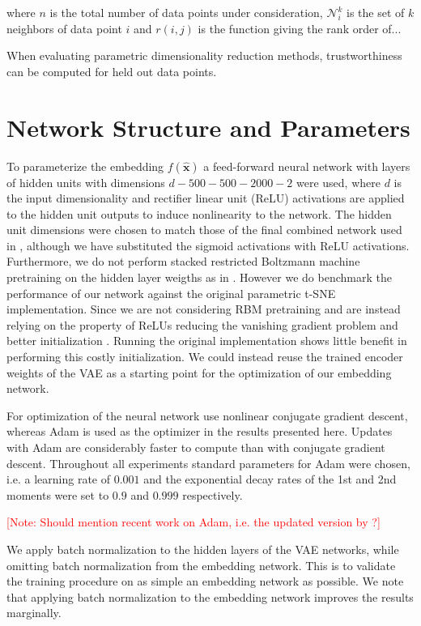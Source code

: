 where $n$ is the total number of data points under consideration, $\mathcal{N}_{i}^{k}$ is the set of $k$ neighbors of data point $i$ and $r(i, j)$ is the function giving the rank order of...

When evaluating parametric dimensionality reduction methods, trustworthiness can be computed for held out data points.

\section{Network Structure and Parameters}

To parameterize the embedding $f(\mathbf{\hat{x}})$ a feed-forward neural network with layers of hidden units with dimensions $d - 500 - 500 - 2000 - 2$ were used, where $d$ is the input dimensionality and rectifier linear unit (ReLU) activations are applied to the hidden unit outputs to induce nonlinearity to the network. The hidden unit dimensions were chosen to match those of the final combined network used in \citep{parametric_tsne}, although we have substituted the sigmoid activations with ReLU activations. Furthermore, we do not perform stacked restricted Boltzmann machine pretraining on the hidden layer weigths as in \citep{parametric_tsne}. However we do benchmark the performance of our network against the original parametric t-SNE implementation. Since we are not considering RBM pretraining and are instead relying on the property of ReLUs reducing the vanishing gradient problem \citep{relu} and better initialization \citep{xavier_initializer}. Running the original implementation shows little benefit in performing this costly initialization. We could instead reuse the trained encoder weights of the VAE as a starting point for the optimization of our embedding network.

For optimization of the neural network \cite{parametric_tsne} use nonlinear conjugate gradient descent, whereas Adam \citep{adam} is used as the optimizer in the results presented here. Updates with Adam are considerably faster to compute than with conjugate gradient descent. Throughout all experiments standard parameters for Adam were chosen, i.e. a learning rate of $0.001$ and the exponential decay rates of the 1st and 2nd moments were set to $0.9$ and $0.999$ respectively.

\textcolor{red}{[Note: Should mention recent work on Adam, i.e. the updated version by \cite{on_the_convergence_of_adam}?]}

We apply batch normalization \citep{batch_normalization} to the hidden layers of the VAE networks, while omitting batch normalization from the embedding network. This is to validate the training procedure on as simple an embedding network as possible. We note that applying batch normalization to the embedding network improves the results marginally.

